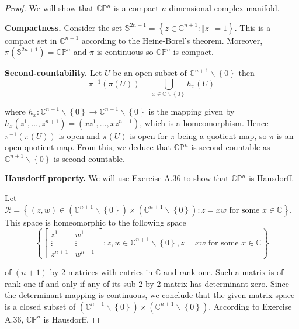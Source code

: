 \begin{proof}
    We will show that \( \mathbb{CP}^{n} \) is a compact \(n\)-dimensional complex manifold.

    \textbf{Compactness.} Consider the set \( \mathbb{S}^{2n+1} = \left\{ z \in \mathbb{C}^{n+1} : \left\Vert z \right\Vert = 1 \right\} \). This is a compact set in \( \mathbb{C}^{n+1} \) according to the Heine-Borel's theorem. Moreover, \( \pi(\mathbb{S}^{2n+1}) = \mathbb{CP}^{n} \) and \( \pi \) is continuous so \( \mathbb{CP}^{n} \) is compact.

    \textbf{Second-countability.} Let \( U \) be an open subset of \( \mathbb{C}^{n+1} \smallsetminus \left\{0\right\} \) then
    \[
        \pi^{-1}(\pi(U)) = \bigcup_{x \in \mathbb{C} \smallsetminus \left\{0\right\}} h_{x}(U)
    \]

    where \( h_{x}: \mathbb{C}^{n+1} \smallsetminus \left\{0\right\} \to \mathbb{C}^{n+1} \smallsetminus \left\{0\right\} \) is the mapping given by \( h_{x}(z^{1}, \ldots, z^{n+1}) = (xz^{1}, \ldots, xz^{n+1}) \), which is a homeomorphism. Hence \( \pi^{-1}(\pi(U)) \) is open and \( \pi(U) \) is open for \( \pi \) being a quotient map, so \( \pi \) is an open quotient map. From this, we deduce that \( \mathbb{CP}^{n} \) is second-countable as \( \mathbb{C}^{n+1} \smallsetminus \left\{0\right\} \) is second-countable.

    \textbf{Hausdorff property.} We will use Exercise A.36 to show that \( \mathbb{CP}^{n} \) is Hausdorff.

    Let \( \mathcal{R} = \left\{ (z, w) \in (\mathbb{C}^{n+1} \smallsetminus \left\{0\right\}) \times (\mathbb{C}^{n+1} \smallsetminus \left\{0\right\}) : z = xw \text{  for some } x \in \mathbb{C} \right\} \). This space is homeomorphic to the following space
    \[
        \left\{ \begin{bmatrix} z^{1} & w^{1} \\ \vdots & \vdots \\ z^{n+1} & w^{n+1} \end{bmatrix} : z, w \in \mathbb{C}^{n+1} \smallsetminus \left\{0\right\}, z = xw \text{ for some } x \in \mathbb{C} \right\}
    \]

    of \((n+1)\)-by-2 matrices with entries in \( \mathbb{C} \) and rank one. Such a matrix is of rank one if and only if any of its sub-2-by-2 matrix has determinant zero. Since the determinant mapping is continuous, we conclude that the given matrix space is a closed subset of \( (\mathbb{C}^{n+1} \smallsetminus \left\{0\right\}) \times (\mathbb{C}^{n+1} \smallsetminus \left\{0\right\}) \). According to Exercise A.36, \( \mathbb{CP}^{n} \) is Hausdorff.


\end{proof}
